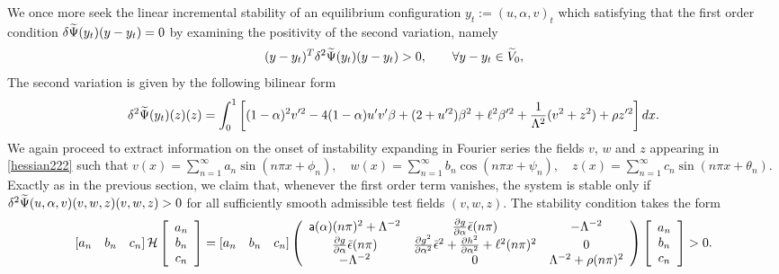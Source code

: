 We once more seek the linear incremental stability of an equilibrium configuration $y_t := (u, \alpha,  v)_t$ which satisfying that the first order condition $\delta \widetilde\Psi(y_t)(y-y_t)=0$  by examining the positivity of the second variation, namely
\begin{equation*}
    (y-y_t)^T\delta^2 \widetilde\Psi(y_t)(y-y_t)>0, \qquad \forall y-y_t\in \widetilde V_0,
\end{equation*}The second variation is given by the following bilinear form 
\begin{equation}
\delta^2 \widetilde\Psi(y_t)(z)(z)=\int_0^1 \left[(1-\alpha)^2v'^2 
- 4(1-\alpha)u' v'\beta+(2+ u'^2)\beta^2+\ell^2\beta'^2 +\frac{1}{\Lambda^2}( v^2 + z^2)+\rho z'^2\right]dx.\label{hessian222}\end{equation}
We again proceed to extract information on the onset of instability expanding in Fourier series the fields $v$, $w$ and $z$ appearing in \eqref{hessian222} such that $v(x)=\sum_{n=1}^{\infty} a_{n} \sin \left(n \pi x+\phi_{n}\right), \quad w(x)=\sum_{n=1}^{\infty} b_{n} \cos \left(n \pi x+\psi_{n}\right),\quad z(x)=\sum_{n=1}^{\infty} c_{n} \sin \left(n \pi x+\theta_{n}\right)$. Exactly as in the previous section, we claim that, whenever the first order term vanishes, the system is stable only if $\delta^2 \widetilde\Psi(u,\alpha, v)(v,w,z)(v,w,z)>0$ for all sufficiently smooth admissible test fields $(v, w, z)$. The stability condition  takes the form
\begin{align}\left[ a_n \quad b_n \quad c_n  \right] \mathcal{H} \left[ \begin{array}{c} a_n \\ b_n  \\ c_n\end{array} \right]=\left[ a_n \quad b_n \quad c_n \right]\left(
\begin{array}{ccc}
\mathsf{a}(\alpha)(n\pi)^2+\Lambda^{-2}& \frac{\partial g}{\partial \alpha}\bar\epsilon(n\pi) &  -\Lambda^{-2} \\
\frac{\partial g}{\partial \alpha}\bar\epsilon(n\pi) & \frac{\partial g^2}{\partial \alpha^2}\bar\epsilon^2+ \frac{\partial h^2}{\partial \alpha^2}+\ell^2(n\pi)^2 & 0 \\
 -\Lambda^{-2} & 0 & \Lambda^{-2} +\rho (n\pi)^2\\
\end{array}
\right)\left[ \begin{array}{c} a_n \\ b_n \\c_n \end{array} \right]>0.\label{hessian3}\end{align}
